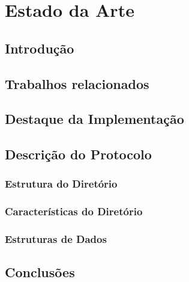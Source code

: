 \chapter{Estado da Arte}
\label{chap:estado-da-arte}

\section{Introdução}
\label{chap2:sec:intro}

\section{Trabalhos relacionados}


\section{Destaque da Implementação}

\section{Descrição do Protocolo}

\subsection{Estrutura do Diretório}

\subsection{Características do Diretório}

\subsection{Estruturas de Dados}

\section{Conclusões}
\label{chap2:sec:concs}
